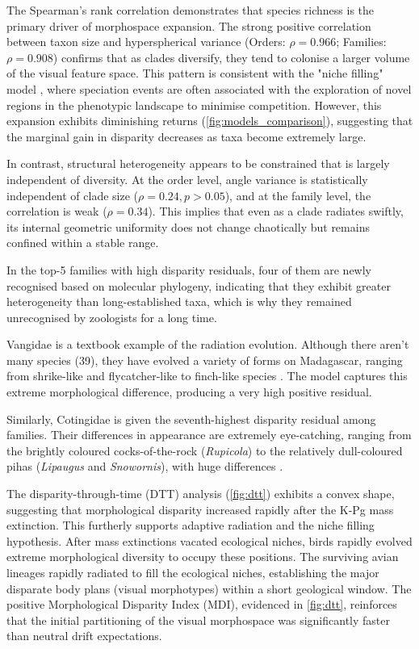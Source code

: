 The Spearman's rank correlation demonstrates that species richness is the primary driver of morphospace expansion.
The strong positive correlation between taxon size and hyperspherical variance (Orders: $\rho = 0.966$; Families: $\rho = 0.908$)
confirms that as clades diversify, they tend to colonise a larger volume of the visual feature space.
This pattern is consistent with the "niche filling" model \parencite{Simpson1944Tempo},
where speciation events are often associated with the exploration of novel regions
in the phenotypic landscape to minimise competition.
However, this expansion exhibits diminishing returns (\cref{fig:models_comparison}),
suggesting that the marginal gain in disparity decreases as taxa become extremely large.

In contrast, structural heterogeneity appears to be constrained that is largely independent of diversity.
At the order level, angle variance is statistically independent of clade size ($\rho=0.24,p>0.05$),
and at the family level, the correlation is weak ($\rho=0.34$).
This implies that even as a clade radiates swiftly, its internal geometric uniformity
does not change chaotically but remains confined within a stable range.

In the top-5 families with high disparity residuals, four of them are newly recognised based on
molecular phylogeny, indicating that they exhibit greater heterogeneity than long-established taxa,
which is why they remained unrecognised by zoologists for a long time.

Vangidae is a textbook example of the radiation evolution.
Although there aren't many species (39), they have evolved a variety of forms on Madagascar,
ranging from shrike-like and flycatcher-like to finch-like species \parencite{Reddy2012Diversification, Jonsson2012Ecological}.
The model captures this extreme morphological difference, producing a very high positive residual.

Similarly, Cotingidae is given the seventh-highest disparity residual among families.
Their differences in appearance are extremely eye-catching, ranging from the
brightly coloured cocks-of-the-rock (\textit{Rupicola})
to the relatively dull-coloured pihas (\textit{Lipaugus} and \textit{Snowornis}),
with huge differences \parencite{Winkler2020Cotingas}.

The disparity-through-time (DTT) analysis (\cref{fig:dtt}) exhibits a convex shape,
suggesting that morphological disparity increased rapidly after the K-Pg mass extinction.
This furtherly supports  adaptive radiation and the niche filling hypothesis.
After mass extinctions vacated ecological niches,
birds rapidly evolved extreme morphological diversity to occupy these positions.
The surviving avian lineages rapidly radiated to fill the ecological niches,
establishing the major disparate body plans (visual morphotypes) within a short geological window.
The positive Morphological Disparity Index (MDI), evidenced in \cref{fig:dtt},
reinforces that the initial partitioning of the visual morphospace
was significantly faster than neutral drift expectations.

